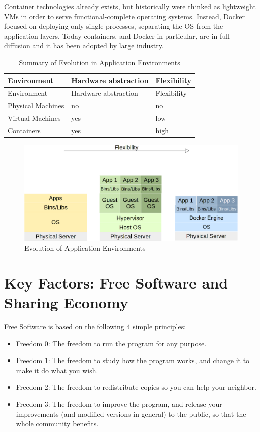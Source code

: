 Container technologies already exists, but historically were thinked as
lightweight VMs in order to serve functional-complete operating systems.
Instead, Docker focused on deploying only single processes, separating
the OS from the application layers. Today containers, and Docker in
particular, are in full diffusion and it has been adopted by large
industry.

\begin{longtable}[c]{@{}lll@{}}
\caption{Summary of Evolution in Application
Environments}\tabularnewline
\toprule
Environment & Hardware abstraction & Flexibility\tabularnewline
\midrule
\endfirsthead
\toprule
Environment & Hardware abstraction & Flexibility\tabularnewline
\midrule
\endhead
Physical Machines & no & no\tabularnewline
Virtual Machines & yes & low\tabularnewline
Containers & yes & high\tabularnewline
\bottomrule
\end{longtable}

\begin{figure}[htbp]
\centering
\includegraphics{media/ch2-containers.png}
\caption{Evolution of Application Environments}
\end{figure}

\section{Key Factors: Free Software and Sharing
Economy}\label{key-factors-free-software-and-sharing-economy}

Free Software is based on the following 4 simple principles:

\begin{itemize}
\itemsep1pt\parskip0pt
\item
  Freedom 0: The freedom to run the program for any purpose.
\item
  Freedom 1: The freedom to study how the program works, and change it
  to make it do what you wish.
\item
  Freedom 2: The freedom to redistribute copies so you can help your
  neighbor.
\item
  Freedom 3: The freedom to improve the program, and release your
  improvements (and modified versions in general) to the public, so that
  the whole community benefits.
\end{itemize}

